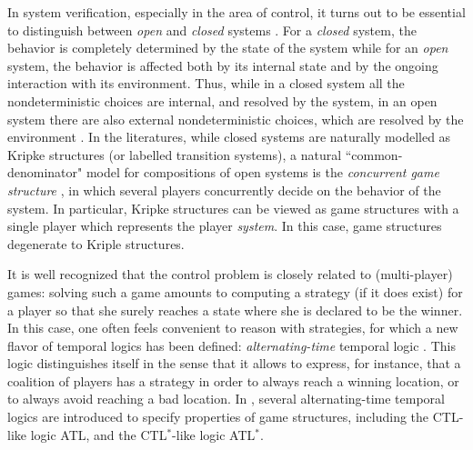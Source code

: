 \documentclass[times, 10 pt,twocolumn]{article}
\newcommand{\lla}{\langle\langle}
\newcommand{\rra}{\rangle\rangle}
\begin{document}
In system verification, especially in the area of control, it
turns out to be essential to distinguish between \emph{open} and
\emph{closed} systems \cite{HP85}. For a \emph{closed} system, the
behavior is completely determined by the state of the system while
for an \emph{open} system, the behavior is affected both by its
internal state and by the ongoing interaction with its
environment. Thus, while in a closed system all the
nondeterministic choices are internal, and resolved by the system,
in an open system there are also external nondeterministic
choices, which are resolved by the environment \cite{Hoa85}. In
the literatures, while closed systems are naturally modelled as
Kripke structures (or labelled transition systems), %
a natural ``common-denominator" model for compositions of open
systems is the \emph{concurrent game structure} \cite{AHK02}, in
which several
players concurrently decide on the behavior of the system. %
In particular, Kripke structures can be viewed as game structures
with a single player which represents the player \emph{system}. In
this case, game structures degenerate to Kriple structures.




It is well recognized that the control problem is closely related
to (multi-player) games: solving such a game amounts to computing
a strategy (if it does exist) for a player so that she surely
reaches a state where she is declared to be the winner. %
In this case, one often feels convenient to reason with
strategies, for which a new flavor of temporal logics has been
defined: \emph{alternating-time} temporal logic \cite{AHK02}. This
logic distinguishes itself in the sense that it allows to express,
for instance, that a coalition of players has a strategy in order
to always reach a winning location, or to always avoid reaching a
bad location. In \cite{AHK02}, several alternating-time temporal
logics are introduced to specify properties of game structures,
including  the  CTL-like logic ATL, and the CTL$^*$-like logic
ATL$^*$.
\end{document}
